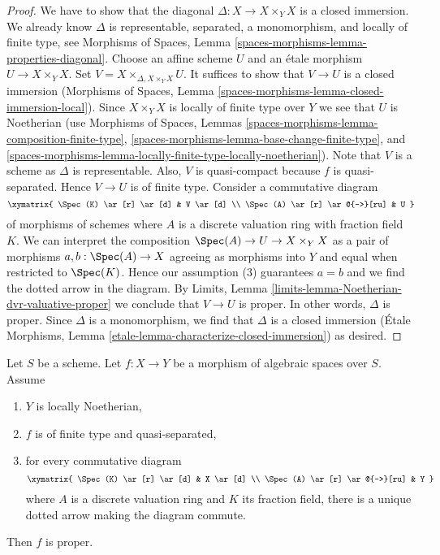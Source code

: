 \begin{proof}
We have to show that the diagonal $\Delta : X \to X \times_Y X$ is a closed
immersion. We already know $\Delta$ is representable, separated,
a monomorphism, and locally of finite type, see Morphisms of Spaces, Lemma
\ref{spaces-morphisms-lemma-properties-diagonal}.
Choose an affine scheme $U$ and an \'etale morphism
$U \to X \times_Y X$. Set $V = X \times_{\Delta, X \times_Y X} U$.
It suffices to show that $V \to U$ is a closed immersion (Morphisms of
Spaces, Lemma \ref{spaces-morphisms-lemma-closed-immersion-local}).
Since $X \times_Y X$ is locally of finite type over $Y$ we see that
$U$ is Noetherian (use Morphisms of Spaces, Lemmas
\ref{spaces-morphisms-lemma-composition-finite-type},
\ref{spaces-morphisms-lemma-base-change-finite-type}, and
\ref{spaces-morphisms-lemma-locally-finite-type-locally-noetherian}).
Note that $V$ is a scheme as $\Delta$ is representable.
Also, $V$ is quasi-compact because $f$ is quasi-separated.
Hence $V \to U$ is of finite type. Consider a commutative diagram
$$
\xymatrix{
\Spec(K) \ar[r] \ar[d] & V \ar[d] \\
\Spec(A) \ar[r] \ar@{-->}[ru] & U
}
$$
of morphisms of schemes
where $A$ is a discrete valuation ring with fraction field $K$.
We can interpret the composition $\Spec(A) \to U \to X \times_Y X$
as a pair of morphisms $a, b : \Spec(A) \to X$ agreeing as morphisms
into $Y$ and equal when restricted to $\Spec(K)$. Hence our assumption
(3) guarantees $a = b$ and we find the dotted arrow in the diagram.
By Limits, Lemma \ref{limits-lemma-Noetherian-dvr-valuative-proper}
we conclude that $V \to U$ is proper. In other words, $\Delta$ is proper.
Since $\Delta$ is a monomorphism, we find that $\Delta$ is a
closed immersion (\'Etale Morphisms, Lemma
\ref{etale-lemma-characterize-closed-immersion}) as desired.
\end{proof}

\begin{lemma}
\label{lemma-check-proper-dvr}
Let $S$ be a scheme. Let $f : X \to Y$ be a morphism of algebraic
spaces over $S$. Assume
\begin{enumerate}
\item $Y$ is locally Noetherian,
\item $f$ is of finite type and quasi-separated,
\item for every commutative diagram
$$
\xymatrix{
\Spec(K) \ar[r] \ar[d] & X \ar[d] \\
\Spec(A) \ar[r] \ar@{-->}[ru] & Y
}
$$
where $A$ is a discrete valuation ring and $K$ its fraction field,
there is a unique dotted arrow making the diagram commute.
\end{enumerate}
Then $f$ is proper.
\end{lemma}

